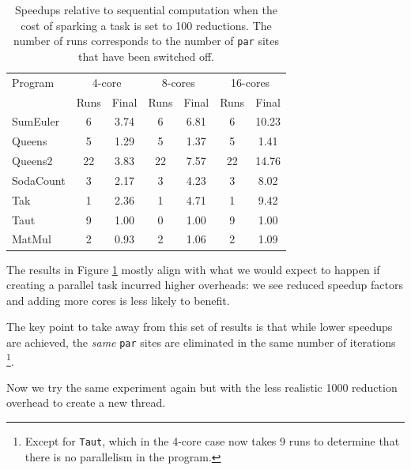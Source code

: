 \begin{table}[ht]
\caption[Profile-Directed Search with overheads of $100$ reductions]{Speedups relative to sequential computation when the cost of sparking
        a task is set to 100 reductions. The number of runs corresponds to the
        number of \texttt{par} sites that have been switched off.}
\centering
\smallskip
  \begin{tabular}{ l||c c c c c c  }
    Program & \multicolumn{2}{c}{4-core} & \multicolumn{2}{c}{8-cores} & \multicolumn{2}{c}{16-cores} \\
            & Runs & Final     & Runs & Final      & Runs & Final \\
    \hline
    SumEuler  & 6    & 3.74      & 6    & 6.81       & 6    & 10.23     \\
    Queens    & 5    & 1.29      & 5    & 1.37       & 5    & 1.41  \\
    Queens2   & 22   & 3.83      & 22   & 7.57       & 22   & 14.76  \\
    SodaCount & 3    & 2.17      & 3    & 4.23       & 3    & 8.02    \\
    Tak       & 1    & 2.36      & 1    & 4.71       & 1    & 9.42   \\
    Taut      & 9    & 1.00      & 0    & 1.00       & 9    & 1.00  \\
    MatMul    & 2    & 0.93      & 2    & 1.06       & 2    & 1.09   \\
  \end{tabular}
\label{table100}
\end{table}

The results in Figure \ref{table100} mostly align with what we would expect to
happen if creating a parallel task incurred higher overheads: we see reduced
speedup factors and adding more cores is less likely to benefit.

The key point to take away from this set of results is that while lower speedups
are achieved, the \emph{same} \verb-par- sites are eliminated in the same
number of iterations \footnote{Except for \texttt{Taut}, which in the 4-core case now
takes 9 runs to determine that there is no parallelism in the program.}.

Now we try the same experiment again but with the less realistic 1000 reduction
overhead to create a new thread.

